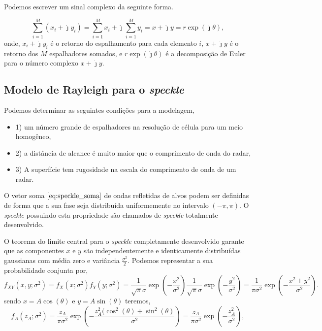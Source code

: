  Podemos escrever um sinal complexo da seguinte forma.

\begin{equation}\label{eq:speckle_soma}
\sum_{i=1}^{M}(x_i+\dot{\jmath} y_i)=\sum_{i=1}^{M}x_i+\dot{\jmath}\sum_{i=1}^{M} y_i=x+\dot{\jmath} y=r\exp(\dot{\jmath}\theta),
\end{equation}
onde, $x_i+\dot{\jmath} y_i$ é o retorno do espalhamento para cada elemento $i$, $x+\dot{\jmath}y$ é o retorno dos $M$ espalhadores somados, e $r\exp(\dot{\jmath}\theta)$ é a decomposição de Euler para o número complexo $x+\dot{\jmath}y$.


\subsection{Modelo de Rayleigh para o \textit{speckle}}
Podemos determinar as seguintes condições para a modelagem,
\begin{itemize}
\item 1) um número grande de espalhadores na resolução de célula para um meio homogêneo,
\item 2) a distância de alcance é muito maior que o comprimento de onda do radar,
\item 3) A superfície tem rugosidade na escala do comprimento de onda de um radar.
\end{itemize}

O vetor soma $\eqref{eq:speckle_soma}$ de ondas refletidas de alvos podem ser definidas de forma que a sua fase seja distribuída uniformemente no intervalo $(-\pi,\pi)$. O \textit{speckle} possuindo esta propriedade são chamados de \textit{speckle} totalmente desenvolvido.  

O teorema do limite central para o \textit{speckle} completamente desenvolvido garante que as componentes $x$ e $y $ são independentemente e identicamente distribuídas gaussianas com média zero e variância $\frac{\sigma^2}{2}$. Podemos representar a sua probabilidade conjunta por,
\begin{equation}\label{eq:pdf_gaussiana_xy}
f_{XY}(x,y;\sigma^2)=f_X(x;\sigma^2)f_Y(y;\sigma^2)=\frac{1}{\sqrt{\pi}\sigma}\exp\left(-\frac{x^2}{\sigma^2}\right)\frac{1}{\sqrt{\pi}\sigma}\exp\left(-\frac{y^2}{\sigma^2}\right)=\frac{1}{\pi\sigma^2}\exp\left(-\frac{x^2+y^2}{\sigma^2}\right).
\end{equation}
sendo $x=A\cos(\theta)$ e $y=A\sin(\theta)$ teremos,
\begin{equation}\label{eq:pdf_gaussiana_Atheta}
f_{A}(z_A;\sigma^2)=\frac{z_A}{\pi\sigma^2}\exp\left(-\frac{z_A^2(\cos^2(\theta)+\sin^2(\theta)}{\sigma^2}\right)=\frac{z_A}{\pi\sigma^2}\exp\left(-\frac{z_A^2}{\sigma^2}\right),
\end{equation}

